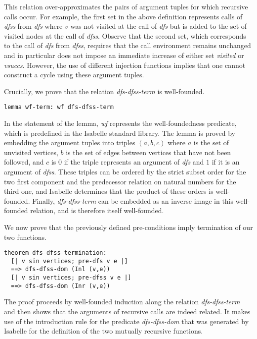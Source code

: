 \documentclass[sigplan,10pt,anonymous,review]{acmart}
\newcommand{\prog}[1]{\textit{#1}}
\begin{document}
This relation over-approximates the pairs of argument tuples for which recursive calls occur. For example, the first set in the above definition represents calls of \prog{dfss} from \prog{dfs} where $v$ was not visited at the call of \prog{dfs} but is added to the set of visited nodes at the call of \prog{dfss}. Observe that the second set, which corresponds to the call of \prog{dfs} from \prog{dfss}, requires that the call environment remains unchanged and in particular does not impose an immediate increase of either set \prog{visited} or \prog{vsuccs}. However, the use of different injection functions implies that one cannot construct a cycle using these argument tuples.

Crucially, we prove that the relation \prog{dfs-dfss-term} is well-founded.

\begin{small}
\begin{lstlisting}[language=isabelle]
lemma wf-term: wf dfs-dfss-term
\end{lstlisting}
\end{small}

In the statement of the lemma, \prog{wf} represents the well-foundedness predicate, which is predefined in the Isabelle standard library. The lemma is proved by embedding the argument tuples into triples $(a,b,c)$ where $a$ is the set of unvisited vertices, $b$ is the set of edges between vertices that have not been followed, and $c$ is $0$ if the triple represents an argument of \prog{dfs} and $1$ if it is an argument of \prog{dfss}. These triples can be ordered by the strict subset order for the two first component and the predecessor relation on natural numbers for the third one, and Isabelle determines that the product of these orders is well-founded. Finally, \prog{dfs-dfss-term} can be embedded as an inverse image in this well-founded relation, and is therefore itself well-founded.

We now prove that the previously defined pre-conditions imply termination of our two functions.

\begin{small}
\begin{lstlisting}[language=isabelle]
theorem dfs-dfss-termination:
  [| v sin vertices; pre-dfs v e |] 
  ==> dfs-dfss-dom (Inl (v,e))
  [| v sin vertices; pre-dfss v e |] 
  ==> dfs-dfss-dom (Inr (v,e))
\end{lstlisting}
\end{small}

The proof proceeds by well-founded induction along the relation \prog{dfs-dfss-term} and then shows that the arguments of recursive calls are indeed related. It makes use of the introduction rule for the predicate \prog{dfs-dfss-dom} that was generated by Isabelle for the definition of the two mutually recursive functions.
\end{document}
